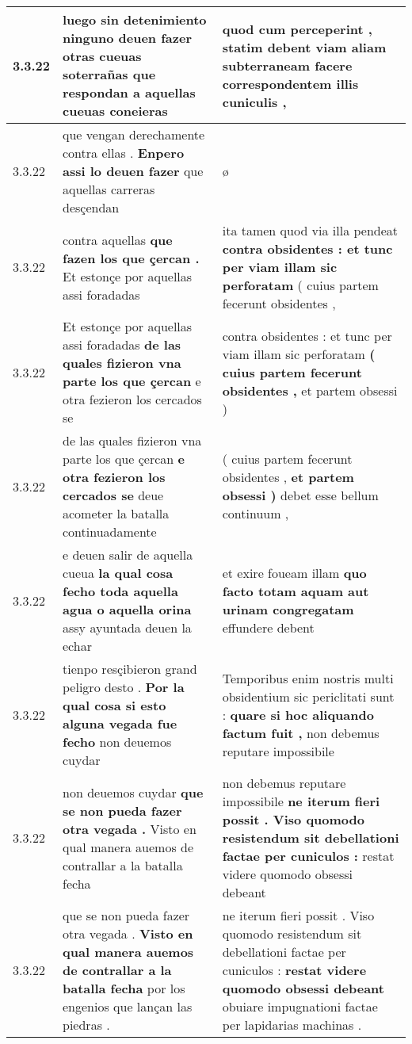 \begin{tabular}{|p{1cm}|p{6.5cm}|p{6.5cm}|}
3.3.22 & luego sin detenimiento \textbf{ ninguno deuen fazer otras cueuas soterrañas } que respondan a aquellas cueuas coneieras & quod cum perceperint , \textbf{ statim debent viam aliam subterraneam } facere correspondentem illis cuniculis , \\\hline
3.3.22 & que vengan derechamente contra ellas . \textbf{ Enpero assi lo deuen fazer } que aquellas carreras desçendan & ø \\\hline
3.3.22 & contra aquellas \textbf{ que fazen los que çercan . } Et estonçe por aquellas assi foradadas & ita tamen quod via illa pendeat \textbf{ contra obsidentes : et tunc per viam illam sic perforatam } ( cuius partem fecerunt obsidentes , \\\hline
3.3.22 & Et estonçe por aquellas assi foradadas \textbf{ de las quales fizieron vna parte los que çercan } e otra fezieron los cercados se & contra obsidentes : et tunc per viam illam sic perforatam \textbf{ ( cuius partem fecerunt obsidentes , } et partem obsessi ) \\\hline
3.3.22 & de las quales fizieron vna parte los que çercan \textbf{ e otra fezieron los cercados se } deue acometer la batalla continuadamente & ( cuius partem fecerunt obsidentes , \textbf{ et partem obsessi ) } debet esse bellum continuum , \\\hline
3.3.22 & e deuen salir de aquella cueua \textbf{ la qual cosa fecho toda aquella agua o aquella orina } assy ayuntada deuen la echar & et exire foueam illam \textbf{ quo facto totam aquam aut urinam congregatam } effundere debent \\\hline
3.3.22 & tienpo resçibieron grand peligro desto . \textbf{ Por la qual cosa si esto alguna vegada fue fecho } non deuemos cuydar & Temporibus enim nostris multi obsidentium sic periclitati sunt : \textbf{ quare si hoc aliquando factum fuit , } non debemus reputare impossibile \\\hline
3.3.22 & non deuemos cuydar \textbf{ que se non pueda fazer otra vegada . } Visto en qual manera auemos de contrallar a la batalla fecha & non debemus reputare impossibile \textbf{ ne iterum fieri possit . Viso quomodo resistendum sit debellationi factae per cuniculos : } restat videre quomodo obsessi debeant \\\hline
3.3.22 & que se non pueda fazer otra vegada . \textbf{ Visto en qual manera auemos de contrallar a la batalla fecha } por los engenios que lançan las piedras . & ne iterum fieri possit . Viso quomodo resistendum sit debellationi factae per cuniculos : \textbf{ restat videre quomodo obsessi debeant } obuiare impugnationi factae per lapidarias machinas . \\\hline

\end{tabular}
